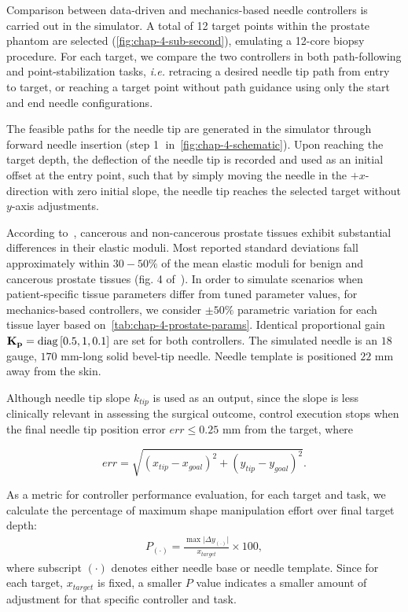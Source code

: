 Comparison between data-driven and mechanics-based needle controllers is carried out in the simulator. A total of 12 target points within the prostate phantom are selected (\cref{fig:chap-4-sub-second}), emulating a 12-core biopsy procedure. For each target, we compare the two controllers in both path-following and point-stabilization tasks, \textit{i.e.} retracing a desired needle tip path from entry to target, or reaching a target point without path guidance using only the start and end needle configurations.

The feasible paths for the needle tip are generated in the simulator through forward needle insertion (step \textcircled{1} in~\cref{fig:chap-4-schematic}). Upon reaching the target depth, the deflection of the needle tip is recorded and used as an initial offset at the entry point, such that by simply moving the needle in the $+x$-direction with zero initial slope, the needle tip reaches the selected target without $y$-axis adjustments.

According to~\parencite{kellyDirectMechanicalCharacterization2019}, cancerous and non-cancerous prostate tissues exhibit substantial differences in their elastic moduli. Most reported standard deviations fall approximately within $30-50\%$ of the mean elastic moduli for benign and cancerous prostate tissues (fig. 4 of~\parencite{kellyDirectMechanicalCharacterization2019}). In order to simulate scenarios when patient-specific tissue parameters differ from tuned parameter values, for mechanics-based controllers, we consider $\pm50\%$ parametric variation for each tissue layer based on~\cref{tab:chap-4-prostate-params}. Identical proportional gain $\mathbf{K_p} = \operatorname{diag}{[0.5, 1, 0.1]}$ are set for both controllers. The simulated needle is an $18$ gauge, $170$ mm-long solid bevel-tip needle. Needle template is positioned $22$ mm away from the skin.

Although needle tip slope $k_{tip}$ is used as an output, since the slope is less clinically relevant in assessing the surgical outcome, control execution stops when the final needle tip position error $err \leq 0.25$ mm from the target, where

\begin{equation}
  \label{eq:chap-4-error-mag}
  err = \sqrt{(x_{tip} - x_{goal})^2 + (y_{tip} - y_{goal})^2}.
\end{equation}

As a metric for controller performance evaluation, for each target and task, we calculate the percentage of maximum shape manipulation effort over final target depth:
\begin{align}
  \label{eq:chap-4-metric}
  P_{(\cdot)} = \frac{\max{\vert{\Delta y_{(\cdot)}}\vert}}{x_{target}} \times 100,
\end{align}
where subscript $(\cdot)$ denotes either needle base or needle template. Since for each target, $x_{target}$ is fixed, a smaller $P$ value indicates a smaller amount of adjustment for that specific controller and task.

